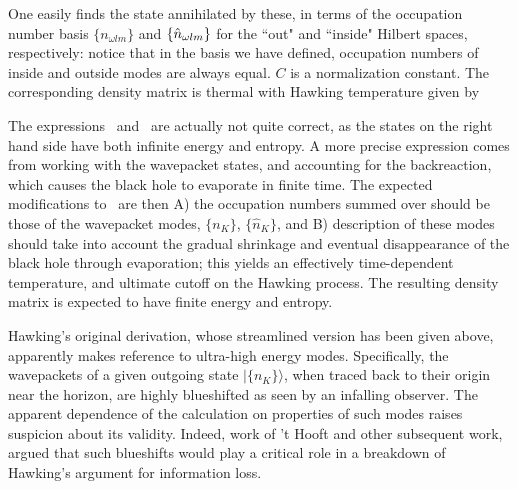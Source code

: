 One easily finds the state annihilated by these, in terms of the occupation number basis $\{n_{\omega lm}\}$ and $\{{\hat n}_{\omega lm}\}$ for 
the ``out" and ``inside" Hilbert spaces, respectively:
%
\eqn{}
%
notice that in the basis we have defined, occupation numbers of inside and outside modes are always equal.  $C$ is a normalization constant.
The corresponding density matrix 
%
\eqn{}
%
is thermal with Hawking temperature given by
%
\eqn{}
%

The expressions \prodH\ and \densmat\ are actually not quite correct, as the states on the right hand side have both infinite energy and entropy.   A more precise expression comes from working with the wavepacket states, and accounting for the backreaction, which causes the black hole to evaporate in finite time.  The expected modifications to \prodH\ are then A) the occupation numbers summed over should be those of the wavepacket modes, $\{n_K\}$, $\{{\hat n}_K\}$, and B) 
description of these modes should take into account the gradual shrinkage and eventual disappearance of the black hole through evaporation; this yields an effectively time-dependent temperature, and ultimate cutoff on the Hawking process.  The resulting density matrix is expected to have finite energy and entropy.


Hawking's original derivation, whose streamlined version has been given above, apparently makes reference to ultra-high energy modes.  Specifically, the wavepackets of a given outgoing state $|\{n_K\}\rangle$, when traced back to their origin near the horizon, are highly blueshifted as seen by an infalling observer.  The apparent dependence of the calculation on properties of such modes raises suspicion about its validity.  Indeed, work of 't Hooft and other subsequent work, argued that such blueshifts would play a critical role in a breakdown of Hawking's argument for information loss.  

